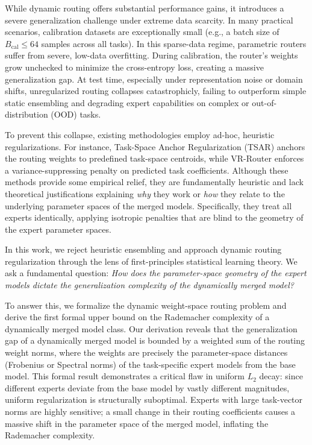 While dynamic routing offers substantial performance gains, it introduces a severe generalization challenge under extreme data scarcity. In many practical scenarios, calibration datasets are exceptionally small (e.g., a batch size of $B_{\text{cal}} \le 64$ samples across all tasks). In this sparse-data regime, parametric routers suffer from severe, low-data overfitting. During calibration, the router's weights grow unchecked to minimize the cross-entropy loss, creating a massive generalization gap. At test time, especially under representation noise or domain shifts, unregularized routing collapses catastrophicly, failing to outperform simple static ensembling and degrading expert capabilities on complex or out-of-distribution (OOD) tasks.

To prevent this collapse, existing methodologies employ ad-hoc, heuristic regularizations. For instance, Task-Space Anchor Regularization (TSAR) anchors the routing weights to predefined task-space centroids, while VR-Router enforces a variance-suppressing penalty on predicted task coefficients. Although these methods provide some empirical relief, they are fundamentally heuristic and lack theoretical justifications explaining \emph{why} they work or \emph{how} they relate to the underlying parameter spaces of the merged models. Specifically, they treat all experts identically, applying isotropic penalties that are blind to the geometry of the expert parameter spaces.

In this work, we reject heuristic ensembling and approach dynamic routing regularization through the lens of first-principles statistical learning theory. We ask a fundamental question: \emph{How does the parameter-space geometry of the expert models dictate the generalization complexity of the dynamically merged model?}

To answer this, we formalize the dynamic weight-space routing problem and derive the first formal upper bound on the Rademacher complexity of a dynamically merged model class. Our derivation reveals that the generalization gap of a dynamically merged model is bounded by a weighted sum of the routing weight norms, where the weights are precisely the parameter-space distances (Frobenius or Spectral norms) of the task-specific expert models from the base model. This formal result demonstrates a critical flaw in uniform $L_2$ decay: since different experts deviate from the base model by vastly different magnitudes, uniform regularization is structurally suboptimal. Experts with large task-vector norms are highly sensitive; a small change in their routing coefficients causes a massive shift in the parameter space of the merged model, inflating the Rademacher complexity.

